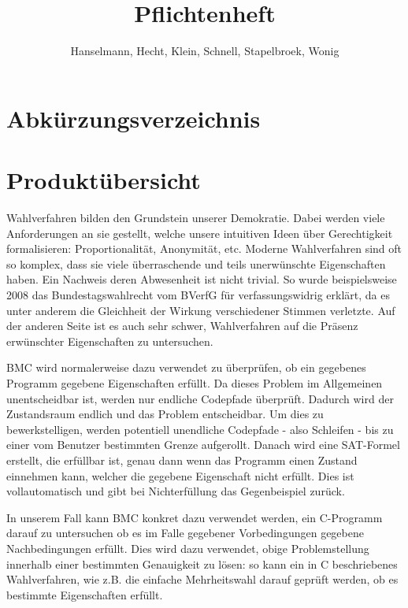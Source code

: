 \documentclass[a4paper]{scrreprt}
\begin{document}
\title{Pflichtenheft}
\author{Hanselmann, Hecht, Klein, Schnell, Stapelbroek, Wonig}
\maketitle 

\tableofcontents	

\listoffigures

\chapter*{Abkürzungsverzeichnis}
\begin{acronym} %
\end{acronym}
 
\chapter{Produktübersicht}
Wahlverfahren bilden den Grundstein unserer Demokratie. Dabei werden viele Anforderungen an sie gestellt, welche unsere intuitiven Ideen über Gerechtigkeit formalisieren: Proportionalität, Anonymität, etc. Moderne Wahlverfahren sind oft so komplex, dass sie viele überraschende und teils unerwünschte Eigenschaften haben. Ein Nachweis deren Abwesenheit ist nicht trivial. So wurde beispielsweise 2008 das Bundestagswahlrecht vom BVerfG für verfassungswidrig erklärt, da es unter anderem die Gleichheit der Wirkung verschiedener Stimmen verletzte. Auf der anderen Seite ist es auch sehr schwer, Wahlverfahren auf die Präsenz erwünschter Eigenschaften zu untersuchen.

\ac{BMC} wird normalerweise dazu verwendet zu überprüfen, ob ein gegebenes Programm gegebene Eigenschaften erfüllt. Da dieses Problem im Allgemeinen unentscheidbar ist, werden nur endliche Codepfade überprüft. Dadurch wird der Zustandsraum endlich und das Problem entscheidbar. Um dies zu bewerkstelligen, werden potentiell unendliche Codepfade - also Schleifen - bis zu einer vom \gls{Benutzer} bestimmten Grenze aufgerollt. Danach wird eine SAT-Formel erstellt, die erfüllbar ist, genau dann wenn das Programm einen Zustand einnehmen kann, welcher die gegebene Eigenschaft nicht erfüllt. Dies ist vollautomatisch und gibt bei Nichterfüllung das Gegenbeispiel zurück.  

In unserem Fall kann \ac{BMC} konkret dazu verwendet werden, ein C-Programm darauf zu untersuchen ob es im Falle gegebener Vorbedingungen gegebene Nachbedingungen erfüllt. Dies wird dazu verwendet, obige Problemstellung innerhalb einer bestimmten Genauigkeit zu lösen: so kann ein in C beschriebenes Wahlverfahren, wie z.B. die einfache Mehrheitswahl darauf geprüft werden, ob es bestimmte Eigenschaften erfüllt.
\end{document}
